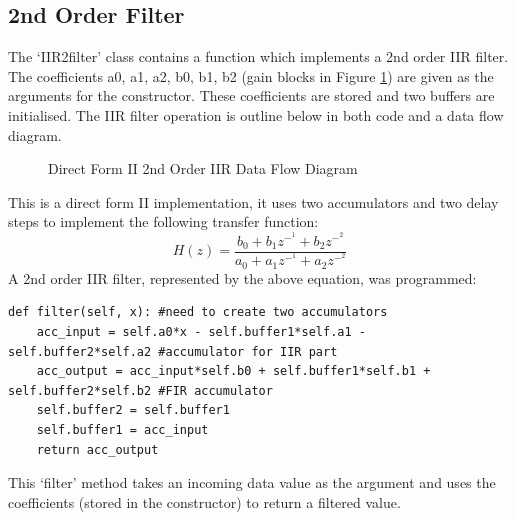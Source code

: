 \documentclass{article}
\begin{document}
\subsection{2nd Order Filter}
The `IIR2filter' class contains a function which implements a 2nd order IIR filter. The coefficients a0, a1, a2, b0, b1, b2 (gain blocks in Figure \ref{fig:dataFlow}) are given as the arguments for the constructor. These coefficients are stored and two buffers are initialised. The IIR filter operation is outline below in both code and a data flow diagram.
\begin{figure}[H]
    \centering
    
    \caption{Direct Form II 2nd Order IIR Data Flow Diagram}
    \label{fig:dataFlow}
\end{figure}
This is a direct form II implementation, it uses two accumulators and two delay steps to implement the following transfer function:
\[H(z) = \frac{b_0+b_1z^-^1+b_2z^-^2}{a_0+a_1z^-^1+a_2z^-^2}\]
A 2nd order IIR filter, represented by the above equation, was programmed:
\begin{lstlisting}
def filter(self, x): #need to create two accumulators
    acc_input = self.a0*x - self.buffer1*self.a1 - self.buffer2*self.a2 #accumulator for IIR part
    acc_output = acc_input*self.b0 + self.buffer1*self.b1 + self.buffer2*self.b2 #FIR accumulator
    self.buffer2 = self.buffer1
    self.buffer1 = acc_input
    return acc_output
\end{lstlisting}
This `filter' method takes an incoming data value as the argument and uses the coefficients (stored in the constructor) to return a filtered value.
\end{document}

